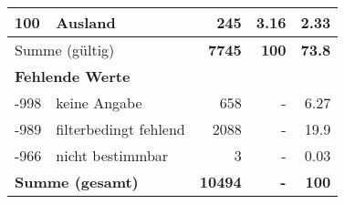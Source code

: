\begin{longtable}{lXrrr}
     100 &
     \multicolumn{1}{X}{ Ausland   } &


       \num{245} &
       \num[round-mode=places,round-precision=2]{3.16} &
         \num[round-mode=places,round-precision=2]{2.33} \\
     \midrule
     \multicolumn{2}{l}{Summe (gültig)} &
       \textbf{\num{7745}} &
     \textbf{\num{100}} &
       \textbf{\num[round-mode=places,round-precision=2]{73.8}} \\
     \multicolumn{5}{l}{\textbf{Fehlende Werte}}\\
       -998 &
       keine Angabe &
         \num{658} &
        - &
         \num[round-mode=places,round-precision=2]{6.27} \\
       -989 &
       filterbedingt fehlend &
         \num{2088} &
        - &
         \num[round-mode=places,round-precision=2]{19.9} \\
       -966 &
       nicht bestimmbar &
         \num{3} &
        - &
         \num[round-mode=places,round-precision=2]{0.03} \\
     \midrule
     \multicolumn{2}{l}{\textbf{Summe (gesamt)}} &
          \textbf{\num{10494}} &
        \textbf{-} &
        \textbf{\num{100}} \\
     \bottomrule
     \end{longtable}
     
